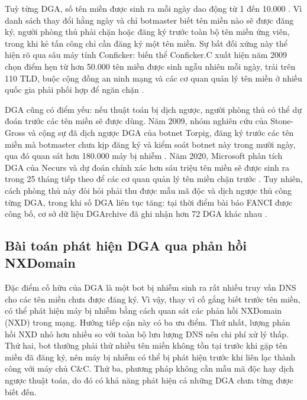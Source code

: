 

Tuỳ từng DGA, số tên miền được sinh ra mỗi ngày dao động từ 1 đến 10.000 \cite{schuppen2018fanci}. Vì danh sách thay đổi hằng ngày và chỉ botmaster biết tên miền nào sẽ được đăng ký, người phòng thủ phải chặn hoặc đăng ký trước toàn bộ tên miền ứng viên, trong khi kẻ tấn công chỉ cần đăng ký một tên miền. Sự bất đối xứng này thể hiện rõ qua sâu máy tính Conficker: biến thể Conficker.C xuất hiện năm 2009 chọn điểm hẹn từ hơn 50.000 tên miền được sinh ngẫu nhiên mỗi ngày, trải trên 110 TLD, buộc cộng đồng an ninh mạng và các cơ quan quản lý tên miền ở nhiều quốc gia phải phối hợp để ngăn chặn \cite{piscitello2010conficker}.

DGA cũng có điểm yếu: nếu thuật toán bị dịch ngược, người phòng thủ có thể dự đoán trước các tên miền sẽ được dùng. Năm 2009, nhóm nghiên cứu của Stone-Gross và cộng sự đã dịch ngược DGA của botnet Torpig, đăng ký trước các tên miền mà botmaster chưa kịp đăng ký và kiểm soát botnet này trong mười ngày, qua đó quan sát hơn 180.000 máy bị nhiễm \cite{stonegross2009torpig}. Năm 2020, Microsoft phân tích DGA của Necurs và dự đoán chính xác hơn sáu triệu tên miền sẽ được sinh ra trong 25 tháng tiếp theo để các cơ quan quản lý tên miền chặn trước \cite{microsoft2020necurs}. Tuy nhiên, cách phòng thủ này đòi hỏi phải thu được mẫu mã độc và dịch ngược thủ công từng DGA, trong khi số DGA liên tục tăng: tại thời điểm bài báo FANCI được công bố, cơ sở dữ liệu DGArchive đã ghi nhận hơn 72 DGA khác nhau \cite{schuppen2018fanci,dgarchive}.

\subsection{Bài toán phát hiện DGA qua phản hồi NXDomain}\label{sec:bai-toan}

Đặc điểm cố hữu của DGA là một bot bị nhiễm sinh ra rất nhiều truy vấn DNS cho các tên miền chưa được đăng ký. Vì vậy, thay vì cố gắng biết trước tên miền, có thể phát hiện máy bị nhiễm bằng cách quan sát các phản hồi NXDomain (NXD) trong mạng. Hướng tiếp cận này có ba ưu điểm. Thứ nhất, lượng phản hồi NXD nhỏ hơn nhiều so với toàn bộ lưu lượng DNS nên chi phí xử lý thấp. Thứ hai, bot thường phải thử nhiều tên miền không tồn tại trước khi gặp tên miền đã đăng ký, nên máy bị nhiễm có thể bị phát hiện trước khi liên lạc thành công với máy chủ C\&C. Thứ ba, phương pháp không cần mẫu mã độc hay dịch ngược thuật toán, do đó có khả năng phát hiện cả những DGA chưa từng được biết đến.

